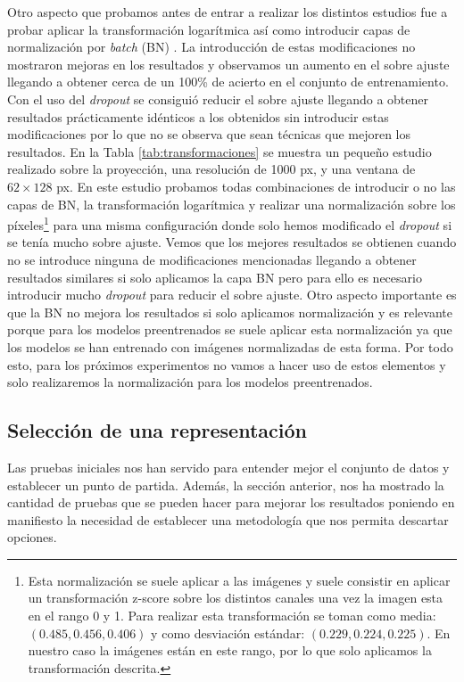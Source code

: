 \documentclass[a4paper,12pt,twoside,titlepage]{article}
\begin{document}
Otro aspecto que probamos antes de entrar a realizar los distintos estudios fue a probar aplicar la transformación logarítmica así como introducir capas de normalización por \textit{batch} (BN) \cite{batchnorm}. La introducción de estas modificaciones no mostraron mejoras en los resultados y observamos un aumento en el sobre ajuste llegando a obtener cerca de un 100\% de acierto en el conjunto de entrenamiento. Con el uso del \textit{dropout} se consiguió reducir el sobre ajuste llegando a obtener resultados prácticamente idénticos a los obtenidos sin introducir estas modificaciones por lo que no se observa que sean técnicas que mejoren los resultados. En la Tabla \ref{tab:transformaciones} se muestra un pequeño estudio realizado sobre la proyección, una resolución de 1000 px, y una ventana de $62\times128$ px. En este estudio probamos todas combinaciones de introducir o no las capas de BN, la transformación logarítmica y realizar una normalización sobre los píxeles\footnote{Esta normalización se suele aplicar a las imágenes y suele consistir en aplicar un transformación z-score sobre los distintos canales una vez la imagen esta en el rango 0 y 1. Para realizar esta transformación se toman como media: $(0.485, 0.456, 0.406)$ y como desviación estándar: $(0.229, 0.224, 0.225)$. En nuestro caso la imágenes están en este rango, por lo que solo aplicamos la transformación descrita.} para una misma configuración donde solo hemos modificado el \textit{dropout} si se tenía mucho sobre ajuste. Vemos que los mejores resultados se obtienen cuando no se introduce ninguna de modificaciones mencionadas llegando a obtener resultados similares si solo aplicamos la capa BN pero para ello es necesario introducir mucho \textit{dropout} para reducir el sobre ajuste. Otro aspecto importante es que la BN no mejora los resultados si solo aplicamos normalización y es relevante porque para los modelos preentrenados se suele aplicar esta normalización ya que los modelos se han entrenado con imágenes normalizadas de esta forma. Por todo esto, para los próximos experimentos no vamos a hacer uso de estos elementos y solo realizaremos la normalización para los modelos preentrenados.

\subsection{Selección de una representación}

Las pruebas iniciales nos han servido para entender mejor el conjunto de datos y establecer un punto de partida. Además, la sección anterior, nos ha mostrado la cantidad de pruebas que se pueden hacer para mejorar los resultados poniendo en manifiesto la necesidad de establecer una metodología que nos permita descartar opciones.
\end{document}
